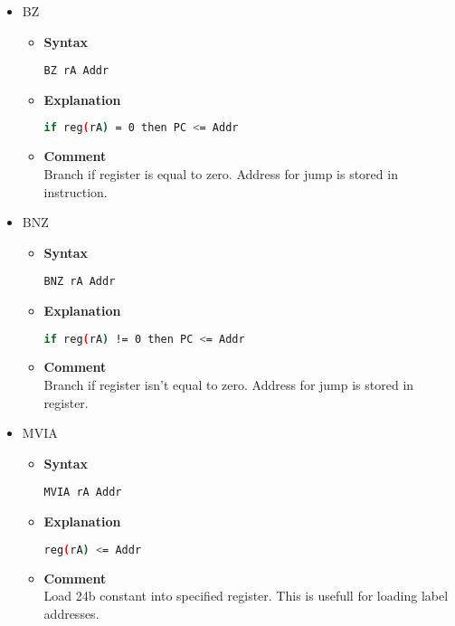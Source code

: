 \begin{itemize}
    \item BZ
    \begin{itemize}
        \item \textbf{Syntax}
        \begin{lstlisting}[language={[markII]Assembler}, frame=single]
    BZ rA Addr
        \end{lstlisting}
        \item \textbf{Explanation}
        \begin{lstlisting}[language=bash, frame=single]
    if reg(rA) = 0 then PC <= Addr
        \end{lstlisting}
        \item \textbf{Comment} \\
    Branch if register is equal to zero. Address for jump is stored in instruction.
    \end{itemize}

    \item BNZ
    \begin{itemize}
        \item \textbf{Syntax}
        \begin{lstlisting}[language={[markII]Assembler}, frame=single]
    BNZ rA Addr
        \end{lstlisting}
        \item \textbf{Explanation}
        \begin{lstlisting}[language=bash, frame=single]
    if reg(rA) != 0 then PC <= Addr
        \end{lstlisting}
        \item \textbf{Comment} \\
    Branch if register isn't equal to zero. Address for jump is stored in register.
    \end{itemize}

    \item MVIA
    \begin{itemize}
        \item \textbf{Syntax}
        \begin{lstlisting}[language={[markII]Assembler}, frame=single]
    MVIA rA Addr
        \end{lstlisting}
        \item \textbf{Explanation}
        \begin{lstlisting}[language=bash, frame=single]
    reg(rA) <= Addr
        \end{lstlisting}
        \item \textbf{Comment} \\
    Load 24b constant into specified register. This is usefull for loading label addresses.
    \end{itemize}


\end{itemize}
